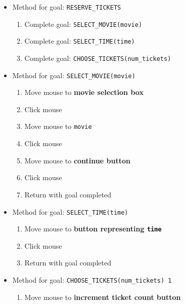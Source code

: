 \documentclass[11pt,a4paper]{report}
\begin{document}
\begin{enumerate}
\begin{itemize}
\begin{itemize}
                        \item Method for goal: \texttt{RESERVE\_TICKETS}
                            \begin{enumerate}
                                \item Complete goal: \texttt{SELECT\_MOVIE(movie)}
                                \item Complete goal: \texttt{SELECT\_TIME(time)}
                                \item Complete goal: \texttt{CHOOSE\_TICKETS(num\_tickets)}
                            \end{enumerate}
                        \item Method for goal: \texttt{SELECT\_MOVIE(movie)}
                            \begin{enumerate}
                                \item Move mouse to \textbf{movie selection box}
                                \item Click mouse
                                \item Move mouse to \texttt{movie}
                                \item Click mouse
                                \item Move mouse to \textbf{continue button}
                                \item Click mouse
                                \item Return with goal completed
                            \end{enumerate}
                        \item Method for goal: \texttt{SELECT\_TIME(time)}
                            \begin{enumerate}
                                \item Move mouse to \textbf{button representing \texttt{time}}
                                \item Click mouse
                                \item Return with goal completed
                            \end{enumerate}
                        \item Method for goal: \texttt{CHOOSE\_TICKETS(num\_tickets) 1}
                            \begin{enumerate}
                                \item Move mouse to \textbf{increment ticket count button}

\end{enumerate}
\end{itemize}
\end{itemize}
\end{enumerate}
\end{document}
